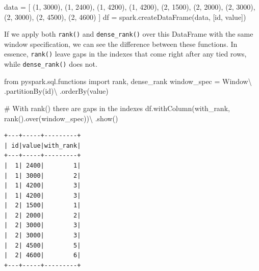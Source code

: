 \documentclass[
  11pt,
  letterpaper,
  DIV=11,
  numbers=noendperiod]{scrreprt}
\newenvironment{Shaded}{\begin{snugshade}}{\end{snugshade}}
\newcommand{\CommentTok}[1]{\textcolor[rgb]{0.37,0.37,0.37}{#1}}
\newcommand{\DecValTok}[1]{\textcolor[rgb]{0.68,0.00,0.00}{#1}}
\newcommand{\ImportTok}[1]{\textcolor[rgb]{0.00,0.46,0.62}{#1}}
\newcommand{\NormalTok}[1]{\textcolor[rgb]{0.00,0.23,0.31}{#1}}
\newcommand{\OperatorTok}[1]{\textcolor[rgb]{0.37,0.37,0.37}{#1}}
\newcommand{\StringTok}[1]{\textcolor[rgb]{0.13,0.47,0.30}{#1}}
\begin{document}
\begin{Shaded}
\begin{Highlighting}[]
\NormalTok{data }\OperatorTok{=}\NormalTok{ [}
\NormalTok{    (}\DecValTok{1}\NormalTok{, }\DecValTok{3000}\NormalTok{), (}\DecValTok{1}\NormalTok{, }\DecValTok{2400}\NormalTok{),}
\NormalTok{    (}\DecValTok{1}\NormalTok{, }\DecValTok{4200}\NormalTok{), (}\DecValTok{1}\NormalTok{, }\DecValTok{4200}\NormalTok{),}
\NormalTok{    (}\DecValTok{2}\NormalTok{, }\DecValTok{1500}\NormalTok{), (}\DecValTok{2}\NormalTok{, }\DecValTok{2000}\NormalTok{),}
\NormalTok{    (}\DecValTok{2}\NormalTok{, }\DecValTok{3000}\NormalTok{), (}\DecValTok{2}\NormalTok{, }\DecValTok{3000}\NormalTok{),}
\NormalTok{    (}\DecValTok{2}\NormalTok{, }\DecValTok{4500}\NormalTok{), (}\DecValTok{2}\NormalTok{, }\DecValTok{4600}\NormalTok{)}
\NormalTok{]}
\NormalTok{df }\OperatorTok{=}\NormalTok{ spark.createDataFrame(data, [}\StringTok{\textquotesingle{}id\textquotesingle{}}\NormalTok{, }\StringTok{\textquotesingle{}value\textquotesingle{}}\NormalTok{])}
\end{Highlighting}
\end{Shaded}

If we apply both \texttt{rank()} and \texttt{dense\_rank()} over this
DataFrame with the same window specification, we can see the difference
between these functions. In essence, \texttt{rank()} leave gaps in the
indexes that come right after any tied rows, while
\texttt{dense\_rank()} does not.

\begin{Shaded}
\begin{Highlighting}[]
\ImportTok{from}\NormalTok{ pyspark.sql.functions }\ImportTok{import}\NormalTok{ rank, dense\_rank}
\NormalTok{window\_spec }\OperatorTok{=}\NormalTok{ Window}\OperatorTok{\textbackslash{}}
\NormalTok{    .partitionBy(}\StringTok{\textquotesingle{}id\textquotesingle{}}\NormalTok{)}\OperatorTok{\textbackslash{}}
\NormalTok{    .orderBy(}\StringTok{\textquotesingle{}value\textquotesingle{}}\NormalTok{)}

\CommentTok{\# With rank() there are gaps in the indexes}
\NormalTok{df.withColumn(}\StringTok{\textquotesingle{}with\_rank\textquotesingle{}}\NormalTok{, rank().over(window\_spec))}\OperatorTok{\textbackslash{}}
\NormalTok{    .show()}
\end{Highlighting}
\end{Shaded}

\begin{verbatim}
+---+-----+---------+
| id|value|with_rank|
+---+-----+---------+
|  1| 2400|        1|
|  1| 3000|        2|
|  1| 4200|        3|
|  1| 4200|        3|
|  2| 1500|        1|
|  2| 2000|        2|
|  2| 3000|        3|
|  2| 3000|        3|
|  2| 4500|        5|
|  2| 4600|        6|
+---+-----+---------+
\end{verbatim}
\end{document}
